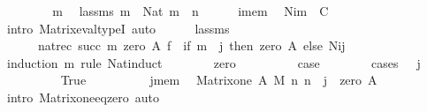 \begin{isabellebody}
\ \ \isacommand{{\isacharbraceleft}{\kern0pt}}\isamarkupfalse%
\isanewline
\ \ \ \ \isamarkupfalse%
\ m\ \isamarkupfalse%
\ lassms{\isacharcolon}{\kern0pt}\ {\isachardoublequoteopen}m\ {\isacharcolon}{\kern0pt}\ Nat{\isachardoublequoteclose}\ {\isachardoublequoteopen}m\ {\isacharless}{\kern0pt}\ n{\isachardoublequoteclose}\isanewline
\ \ \ \ \isamarkupfalse%
\ i{\isacharunderscore}{\kern0pt}mem\ \isamarkupfalse%
\ {\isachardoublequoteopen}N{\isacharbackquote}{\kern0pt}i{\isacharbackquote}{\kern0pt}m\ {\isacharcolon}{\kern0pt}\ C{\isachardoublequoteclose}\ \isamarkupfalse%
\ {\isacharparenleft}{\kern0pt}intro\ Matrix{\isacharunderscore}{\kern0pt}eval{\isacharunderscore}{\kern0pt}typeI{\isacharparenright}{\kern0pt}\ auto\isanewline
\ \ \ \ \isamarkupfalse%
\ lassms\ \isamarkupfalse%
\isanewline
\ \ \ \ \ \ {\isachardoublequoteopen}nat{\isacharunderscore}{\kern0pt}rec{\isacharprime}{\kern0pt}\ {\isacharparenleft}{\kern0pt}succ\ m{\isacharparenright}{\kern0pt}\ {\isacharparenleft}{\kern0pt}zero\ A{\isacharparenright}{\kern0pt}\ {\isacharquery}{\kern0pt}f\ {\isacharequal}{\kern0pt}\ {\isacharparenleft}{\kern0pt}if\ m\ {\isacharless}{\kern0pt}\ j\ then\ zero\ A\ else\ N{\isacharbackquote}{\kern0pt}i{\isacharbackquote}{\kern0pt}j{\isacharparenright}{\kern0pt}{\isachardoublequoteclose}\isanewline
\ \ \ \ \isamarkupfalse%
\ {\isacharparenleft}{\kern0pt}induction\ m\ rule{\isacharcolon}{\kern0pt}\ Nat{\isacharunderscore}{\kern0pt}induct{\isacharparenright}{\kern0pt}\isanewline
\ \ \ \ \ \ \isamarkupfalse%
\ zero\isanewline
\ \ \ \ \ \ \isamarkupfalse%
\ \isamarkupfalse%
\ {\isacharquery}{\kern0pt}case\isanewline
\ \ \ \ \ \ \isamarkupfalse%
\ {\isacharparenleft}{\kern0pt}cases\ {\isachardoublequoteopen}{}\ {\isacharless}{\kern0pt}\ j{\isachardoublequoteclose}{\isacharparenright}{\kern0pt}\isanewline
\ \ \ \ \ \ \ \ \isamarkupfalse%
\ True\isanewline
\ \ \ \ \ \ \ \ \isamarkupfalse%
\ j{\isacharunderscore}{\kern0pt}mem\ \isamarkupfalse%
\ {\isachardoublequoteopen}Matrix{\isacharunderscore}{\kern0pt}one\ A\ M\ n\ n\ {\isacharbackquote}{\kern0pt}{}\ {\isacharbackquote}{\kern0pt}j\ {\isacharequal}{\kern0pt}\ zero\ A{\isachardoublequoteclose}\isanewline
\ \ \ \ \ \ \ \ \ \ \isamarkupfalse%
\ {\isacharparenleft}{\kern0pt}intro\ Matrix{\isacharunderscore}{\kern0pt}one{\isacharunderscore}{\kern0pt}eq{\isacharunderscore}{\kern0pt}zero{\isacharparenright}{\kern0pt}\ auto\isanewline

\end{isabellebody}
